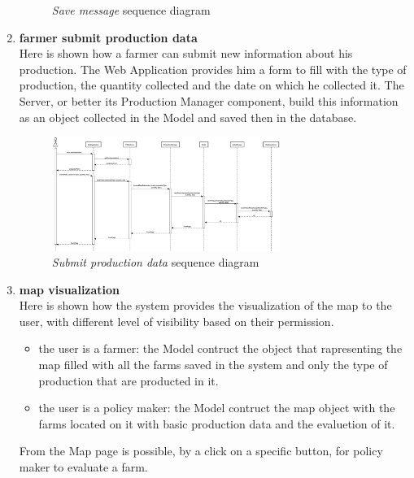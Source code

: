 \begin{enumerate}
\begin{figure}[H]
\begin{center}
        \caption{\emph{Save message} sequence diagram}
        \label{fig:sequence3}
        \end{center}
    \end{figure}
    \item \textbf{farmer submit production data}\\
    Here is shown how a farmer can submit new information about his production. The Web Application provides him a form to fill with the type of production, the quantity collected and the date on which he collected it. The Server, or better its Production Manager component, build this information as an object collected in the Model and saved then in the database.
    \begin{figure}[H]
        \begin{center}
        \includegraphics[width=0.7\textwidth]{sequance/addData-2.png}
        \caption{\emph{Submit production data} sequence diagram}
        \label{fig:sequence4}
        \end{center}
    \end{figure}
    \item \textbf{map visualization}\\
    Here is shown how the system provides the visualization of the map to the user, with different level of visibility based on their permission.
        \begin{itemize}
            \item the user is a farmer: the Model contruct the object that rapresenting the map filled with all the farms saved in the system and only the type of production that are producted in it.
            \item the user is a policy maker: the Model contruct the map object with the farms located on it with basic production data and the evaluetion of it.
        \end{itemize}
    From the Map page is possible, by a click on a specific button, for policy maker to evaluate a farm.
    \begin{figure}[H]
        \begin{center}

\end{center}
\end{figure}
\end{enumerate}
